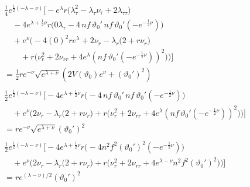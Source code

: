 \documentclass[12pt]{article}
\begin{document}
\begin{align*}
&\frac{1}{4} e^{\frac{1}{2}(-\lambda - \nu)} 
\Big[ 
     - e^{\lambda} r 
    \big(
        \lambda_\tau^2 
        - \lambda_\tau \nu_\tau
        + 2 \lambda_{\tau\tau}
    \big) \\
    & \quad - 4 e^{\lambda + \frac{1}{2}\nu} r 
    \big(
        0 \lambda_\tau 
        - 4 \, nf \, \vartheta_0' \, nf \, \vartheta_0' (- e^{-\frac{1}{2}\nu})
    \big) \\
    & \quad + e^{\nu} 
    \Big(
        -4 (0)^2 r e^{\lambda}
        + 2 \nu_r
        - \lambda_r
        \big(2 + r \nu_r \big) \\
        & \qquad + r \big(
            \nu_r^2 
            + 2 \nu_{rr} 
            + 4 e^{\lambda} 
            (nf \, \vartheta_0' (- e^{-\frac{1}{2}\nu}))^2
        \big)
    \Big)
\Big] \\
&= \frac{1}{2} r e^{-\nu} \sqrt{e^{\lambda + \nu}} 
\left(
    2 V(\vartheta_0) e^{\nu} + (\vartheta_0')^2
\right) \\ \\
&\frac{1}{2} e^{\frac{1}{2}(-\lambda - \nu)} 
\Big[  - 4 e^{\lambda + \frac{1}{2}\nu} r 
    \big(
        - 4 \, nf \, \vartheta_0' \, nf \, \vartheta_0' (- e^{-\frac{1}{2}\nu})
    \big) \\
    & \quad + e^{\nu} 
    \Big(
        2 \nu_r
        - \lambda_r
        \big(2 + r \nu_r \big)
        + r \big(
            \nu_r^2 
            + 2 \nu_{rr} 
            + 4 e^{\lambda} 
            (nf \, \vartheta_0' (- e^{-\frac{1}{2}\nu}))^2
        \big)
    \Big)
\Big] \\
&= r e^{-\nu} \sqrt{e^{\lambda + \nu}} (\vartheta_0')^2 \\ \\
&\frac{1}{2} e^{\frac{1}{2}(-\lambda - \nu)} 
\Big[  - 4 e^{\lambda + \frac{1}{2}\nu} r 
    \big(
        - 4 n^2 f^2 (\vartheta_0')^2 (- e^{-\frac{1}{2}\nu})
    \big) \\
    & \quad + e^{\nu} 
    \Big(
        2 \nu_r
        - \lambda_r
        \big(2 + r \nu_r \big)
        + r \big(
            \nu_r^2 
            + 2 \nu_{rr} 
            + 4 e^{\lambda-\nu} n^2 f^2 (\vartheta_0')^2
        \big)
    \Big)
\Big] \\
&= r e^{(\lambda-\nu)/2} (\vartheta_0')^2
\end{align*}
\end{document}
